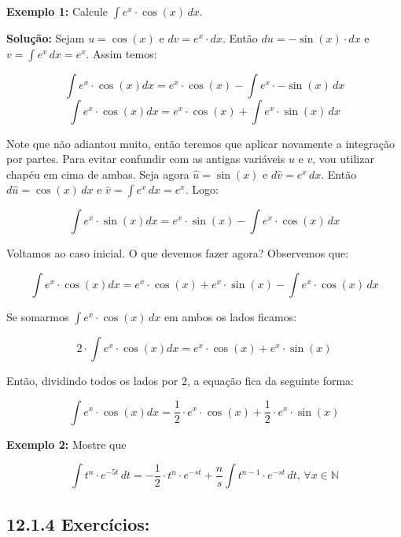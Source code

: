 \documentclass[article,12pt,oneside,a4paper,brazil]{abntex2}
\begin{document}
	\begin{flushleft}
		\textbf{Exemplo 1:} Calcule $\int e^x \cdot \cos({x}) \,dx$. 
		
		\textbf{Solução: } Sejam $u = \cos({x})$ e $dv = e^x \cdot dx$. Então $du = - \sin({x}) \cdot dx$ e $v = \int e^x \,dx = e^x$. Assim temos:
		
		\begin{equation*}
			\int e^x \cdot \cos{(x)} dx = e^x \cdot \cos{(x)} - \int e^x \cdot - \sin{(x)} \,dx
		\end{equation*}
		\begin{equation*}
			\int e^x \cdot \cos{(x)} dx = e^x \cdot \cos{(x)} + \int e^x \cdot \sin{(x)} \,dx
		\end{equation*}
		
		Note que não adiantou muito, então teremos que aplicar novamente a integração por partes. Para evitar confundir com as antigas variáveis $u$ e $v$, vou utilizar chapéu em cima de ambas. Seja agora $\hat{u} = \sin{(x)}$ e $d\hat{v} =e^x \,dx$. Então $d\hat{u} = \cos{(x)} \,dx$ e $\hat{v} = \int e^x \,dx = e^x$. Logo: 
		
		\begin{equation*}
			\int e^x \cdot \sin{(x)} dx = e^x \cdot \sin{(x)} - \int e^x \cdot \cos{(x)} \,dx
		\end{equation*}
		
		Voltamos ao caso inicial. O que devemos fazer agora? Observemos que:
		
		\begin{equation*}
			\int e^x \cdot \cos{(x)} dx = e^x \cdot \cos{(x)} + e^x \cdot \sin{(x)} - \int e^x \cdot \cos{(x)} \,dx
		\end{equation*}
		
		Se somarmos $\int e^x \cdot \cos{(x)} \,dx$ em ambos os lados ficamos:
		
		\begin{equation*}
			2 \cdot \int e^x \cdot \cos{(x)} dx = e^x \cdot \cos{(x)} + e^x \cdot \sin{(x)}
		\end{equation*}
		
		Então, dividindo todos os lados por $2$, a equação fica da seguinte forma: 
		
		\begin{equation*}
			\int e^x \cdot \cos{(x)} dx = \frac{1}{2} \cdot e^x \cdot \cos{(x)} + \frac{1}{2} \cdot e^x \cdot \sin{(x)}
		\end{equation*}
		
		\vspace{2em}
		
		\textbf{Exemplo 2:} Mostre que
		
		\begin{equation*}
			\int t^n \cdot e^{-5t} \,dt = - \frac{1}{2} \cdot t^n \cdot e^{-st} + \frac{n}{s} \int t^{n-1} \cdot e^{-st} \,dt \text{, } \forall x \in \mathbb{N}
		\end{equation*}
		
	\end{flushleft}
	
	\subsection*{12.1.4 Exercícios: }
	\begin{flushleft}	
		
	\end{flushleft}
	
	
	
	
\end{document}

